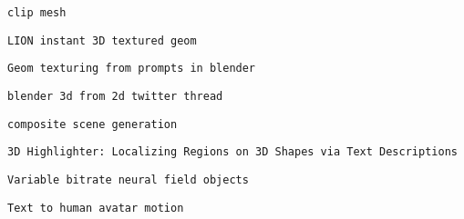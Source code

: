          
         
          \protect\hypertarget{ID_1641767420}{}{}

\begin{verbatim}
clip mesh
\end{verbatim}
         

         
         
          \protect\hypertarget{ID_583402730}{}{}

\begin{verbatim}
LION instant 3D textured geom
\end{verbatim}
         

         
         
          \protect\hypertarget{ID_1369085428}{}{}

\begin{verbatim}
Geom texturing from prompts in blender
\end{verbatim}
         

         
         
          \protect\hypertarget{ID_1479905250}{}{}

\begin{verbatim}
blender 3d from 2d twitter thread
\end{verbatim}
         

         
         
          \protect\hypertarget{ID_1506819989}{}{}

\begin{verbatim}
composite scene generation
\end{verbatim}
         

         
         
          \protect\hypertarget{ID_1739129998}{}{}

\begin{verbatim}
3D Highlighter: Localizing Regions on 3D Shapes via Text Descriptions
\end{verbatim}
         

         
         
          \protect\hypertarget{ID_174290547}{}{}

\begin{verbatim}
Variable bitrate neural field objects
\end{verbatim}
         

         
         
          \protect\hypertarget{ID_1065634316}{}{}

\begin{verbatim}
Text to human avatar motion
\end{verbatim}
         

